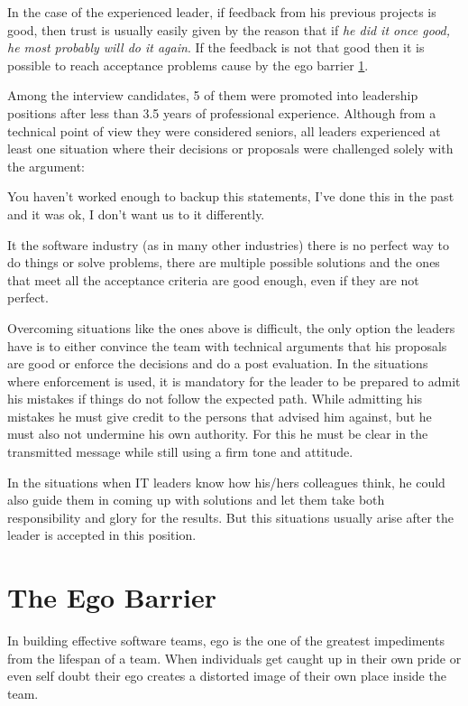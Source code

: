 In the case of the experienced leader, if feedback from his previous projects is good, then trust is usually easily given by the reason that if \textit{he did it once good, he most probably will do it again}. If the feedback is not that good then it is possible to reach acceptance problems cause by the ego barrier \ref{sec:ego}.

Among the interview candidates, 5 of them were promoted into leadership positions after less than 3.5 years of professional experience. Although from a technical point of view they were considered seniors, all  leaders experienced at least one situation where their decisions or proposals were challenged solely with the argument:
\begin{displayquote}
You haven't worked enough to backup this statements, I've done this in the past and it was ok, I don't want us to it differently.
\end{displayquote}
It the software industry (as in many other industries) there is no perfect way to do things or solve problems, there are multiple possible solutions and the ones that meet all the acceptance criteria are good enough, even if they are not perfect.

Overcoming situations like the ones above is difficult, the only option the leaders have is to either convince the team with technical arguments that his proposals are good or enforce the decisions and do a post evaluation. In the situations where enforcement is used, it is mandatory for the leader to be prepared to admit his mistakes if things do not follow the expected path. While admitting his mistakes he must give credit to the persons that advised him against, but he must also not undermine his own authority. For this he must be clear in the transmitted message while still using a firm tone and attitude. 

In the situations when IT leaders know how his/hers colleagues think, he could also guide them in coming up with solutions and let them take both responsibility and glory for the results. But this situations usually arise after the leader is accepted in this position.
\section{The Ego Barrier}
\label{sec:ego}
In building effective software teams, ego is the one of the greatest impediments from the lifespan of a team. When individuals get caught up in their own pride or even self doubt their ego creates a distorted image of their own place inside the team. 

